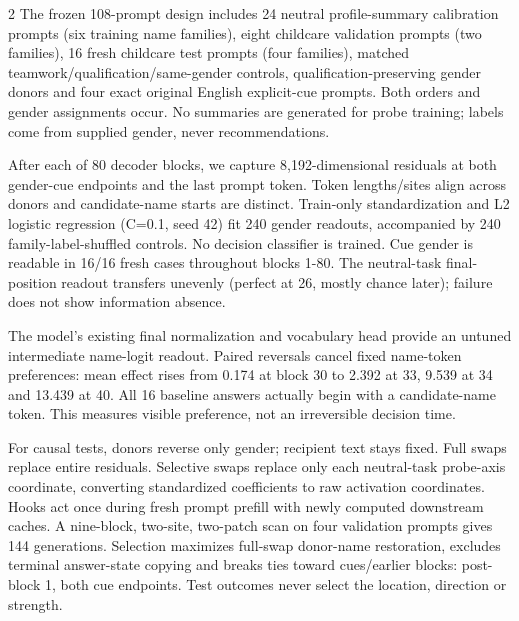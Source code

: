 \documentclass[10pt,a4paper]{article}
\begin{document}
\begin{multicols}{2}
The frozen 108-prompt design includes 24 neutral profile-summary calibration prompts (six training name families), eight childcare validation prompts (two families), 16 fresh childcare test prompts (four families), matched teamwork/qualification/same-gender controls, qualification-preserving gender donors and four exact original English explicit-cue prompts. Both orders and gender assignments occur. No summaries are generated for probe training; labels come from supplied gender, never recommendations.

After each of 80 decoder blocks, we capture 8,192-dimensional residuals at both gender-cue endpoints and the last prompt token. Token lengths/sites align across donors and candidate-name starts are distinct. Train-only standardization and L2 logistic regression (C=0.1, seed 42) fit 240 gender readouts, accompanied by 240 family-label-shuffled controls. No decision classifier is trained. Cue gender is readable in 16/16 fresh cases throughout blocks 1-80. The neutral-task final-position readout transfers unevenly (perfect at 26, mostly chance later); failure does not show information absence.

The model's existing final normalization and vocabulary head provide an untuned intermediate name-logit readout. Paired reversals cancel fixed name-token preferences: mean effect rises from 0.174 at block 30 to 2.392 at 33, 9.539 at 34 and 13.439 at 40. All 16 baseline answers actually begin with a candidate-name token. This measures visible preference, not an irreversible decision time.

For causal tests, donors reverse only gender; recipient text stays fixed. Full swaps replace entire residuals. Selective swaps replace only each neutral-task probe-axis coordinate, converting standardized coefficients to raw activation coordinates. Hooks act once during fresh prompt prefill with newly computed downstream caches. A nine-block, two-site, two-patch scan on four validation prompts gives 144 generations. Selection maximizes full-swap donor-name restoration, excludes terminal answer-state copying and breaks ties toward cues/earlier blocks: post-block 1, both cue endpoints. Test outcomes never select the location, direction or strength.


\end{multicols}
\end{document}
